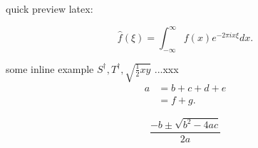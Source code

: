 
\begin{enabstract}

quick preview latex: 

\begin{equation}
  \hat{f}(\xi) = \int_{-\infty}^\infty f(x) e^{-2 \pi i x \xi} d x.
  \label{eq:example}
\end{equation}

some inline example $S^\dagger,T^\dagger,\sqrt {\frac12xy}$ ...xxx 
\begin{align}
  a & = b + c + d + e \label{eq:align_1} \\
    & = f + g. \label{eq:align_2}
\end{align}

\begin{equation}
  \label{eq: root_formula}
  \frac{-b \pm \sqrt{b^{2} - 4ac}}{2a}
\end{equation}

\end{enabstract}